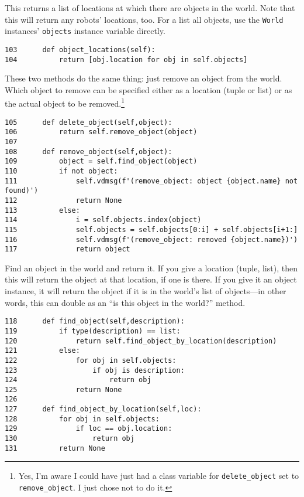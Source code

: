 \documentclass[11pt]{tufte-handout}
\begin{document}
This returns a list of locations at which there are objects in the world.  Note that this will return any robots' locations, too.  For a list all objects, use the \texttt{World} instances' \texttt{objects} instance variable directly.

\begin{verbatim}
103      def object_locations(self):
104          return [obj.location for obj in self.objects]
\end{verbatim}

These two methods do the same thing: just remove an object from the world.  Which object to remove can be specified either as a location (tuple or list) or as the actual object to be removed.\footnote{Yes, I'm aware I could have just had a class variable for \texttt{delete\_object} set to \texttt{remove\_object}.  I just chose not to do it.}

\begin{verbatim}
105      def delete_object(self,object):
106          return self.remove_object(object)
107  
108      def remove_object(self,object):
109          object = self.find_object(object)
110          if not object:
111              self.vdmsg(f'(remove_object: object {object.name} not found)')
112              return None
113          else:
114              i = self.objects.index(object)
115              self.objects = self.objects[0:i] + self.objects[i+1:]
116              self.vdmsg(f'(remove_object: removed {object.name})')
117              return object
\end{verbatim}

Find an object in the world and return it.  If you give a location (tuple, list), then this will return the object at that location, if one is there.  If you give it an object instance, it will return the object if it is in the world's list of objects---in other words, this can double as an ``is this object in the world?'' method.

\begin{verbatim}
118      def find_object(self,description):
119          if type(description) == list:
120              return self.find_object_by_location(description)
121          else:
122              for obj in self.objects:
123                  if obj is description:
124                      return obj
125              return None
126  
127      def find_object_by_location(self,loc):
128          for obj in self.objects:
129              if loc == obj.location:
130                  return obj
131          return None
\end{verbatim}
\end{document}
